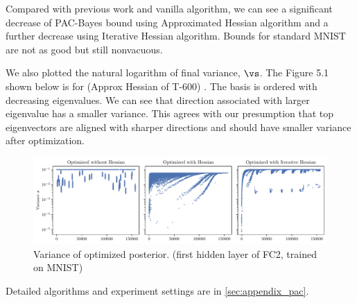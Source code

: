 Compared with previous work and vanilla algorithm, we can see a significant decrease of PAC-Bayes bound using Approximated Hessian algorithm and a further decrease using Iterative Hessian algorithm. Bounds for standard MNIST are not as good but still nonvacuous.

We also plotted the natural logarithm of final variance, $\vs$. The Figure 5.1 shown below is for (Approx Hessian of T-600) . The basis is ordered with decreasing eigenvalues. We can see that direction associated with larger eigenvalue has a smaller variance. This agrees with our presumption that top eigenvectors are aligned with sharper directions and should have smaller variance after optimization.

\begin{figure}[ht]
    \centering
    \includegraphics[width=\textwidth]{Figures/PacBayes/FC2_10cls/sigma_post_compare_iter_Sigma_post_MNIST_Exp1FC2_fixlr0.01_fc1.weight.pdf}
    \captionsetup{justification=centering}
    \caption{Variance of optimized posterior. (first hidden layer of FC2, trained on MNIST)}
    \label{fig:PAC}
\end{figure}

Detailed algorithms and experiment settings are in \cref{sec:appendix_pac}.